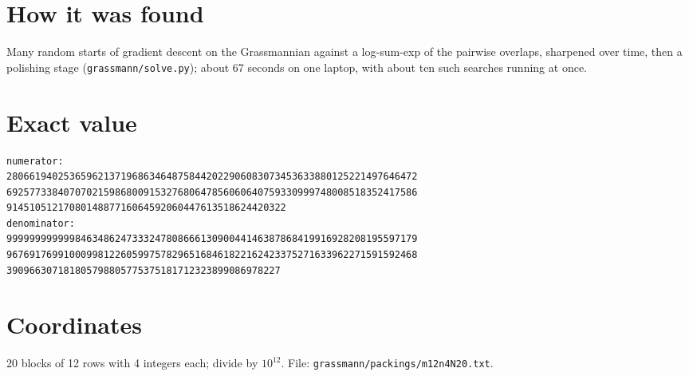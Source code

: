 \documentclass[11pt,a4paper]{article}
\begin{document}
\section{How it was found}
Many random starts of gradient descent on the Grassmannian against a log-sum-exp of the pairwise overlaps, sharpened over time, then a polishing stage (\texttt{grassmann/solve.py}); about 67 seconds on one laptop, with about ten such searches running at once.


\appendix
\section{Exact value}
{\small
\begin{verbatim}
numerator:
280661940253659621371968634648758442022906083073453633880125221497646472
692577338407070215986800915327680647856060640759330999748008518352417586
9145105121708014887716064592060447613518624420322
denominator:
999999999999846348624733324780866613090044146387868419916928208195597179
967691769910009981226059975782965168461822162423375271633962271591592468
390966307181805798805775375181712323899086978227
\end{verbatim}}

\section{Coordinates}
20 blocks of 12 rows with 4 integers each; divide by $10^{12}$. File: \texttt{grassmann/packings/m12n4N20.txt}.
{\tiny
\begin{multicols}{3}
\end{multicols}}
\end{document}
